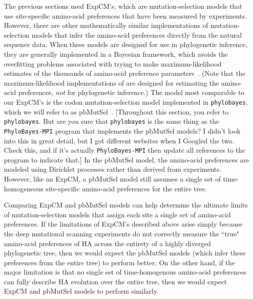 \documentclass[11pt]{article}
\newcommand\jdbcomment[1]{{\color{red}[#1]}}
\begin{document}
The previous sections used ExpCM's, which are mutation-selection models that use site-specific amino-acid preferences that have been measured by experiments. 
However, there are other mathematically similar implementations of mutation-selection models that infer the amino-acid preferences directly from the natural sequence data. 
When these models are designed for use in phylogenetic inference, they are generally implemented in a Bayesian framework, which avoids the overfitting problems associated with trying to make maximum-likelihood estimates of the thousands of amino-acid preference parameters~\citep{lartillot2014overcoming}.
(Note that the maximum-likelihood implementations of \citet{tamuri2012estimating,tamuri2014penalized} are designed for estimating the amino-acid preferences, \emph{not} for phylogenetic inference.)
The model most comparable to our ExpCM's is the codon mutation-selection model implemented in \texttt{phylobayes}, which we will refer to as pbMutSel~\citep{rodrigue2014site}. 
\jdbcomment{Throughout this section, you refer to \texttt{phylobayes}. But are you sure that \texttt{phylobayes} is the same thing as the \texttt{PhyloBayes-MPI} program that implements the pbMutSel models? I didn't look into this in great detail, but I got different websites when I Googled the two. Check this, and if it's actually \texttt{PhyloBayes-MPI} then update all references to the program to indicate that.}
In the pbMutSel model, the amino-acid preferences are modeled using Dirichlet processes rather than derived from experiments. 
However, like an ExpCM, a pbMutSel model still assumes a single set of time-homogeneous site-specific amino-acid preferences for the entire tree.

Comparing ExpCM and pbMutSel models can help determine the ultimate limits of mutation-selection models that assign each site a single set of amino-acid preferences. 
If the limitations of ExpCM's described above arise simply because the deep mutational scanning experiments do not correctly measure the ``true" amino-acid preferences of HA across the entirety of a highly diverged phylogenetic tree, then we would expect the pbMutSel models (which infer these preferences from the entire tree) to perform better.
On the other hand, if the major limitation is that no single set of time-homogenous amino-acid preferences can fully describe HA evolution over the entire tree, then we would expect ExpCM and pbMutSel models to perform similarly.
\end{document}
